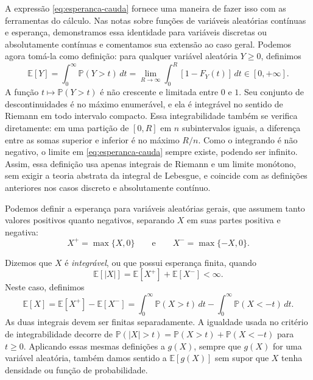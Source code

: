 \documentclass[12pt,portuguese]{article}
\theoremstyle{definition}
\theoremstyle{plainexercise}
\theoremstyle{starredexercise}
\theoremstyle{definition}
\begin{document}
A expressão \eqref{eq:esperanca-cauda} fornece uma maneira de fazer isso
com as ferramentas do cálculo. Nas notas sobre funções de variáveis
aleatórias contínuas e esperança, demonstramos essa identidade para variáveis discretas ou
absolutamente contínuas e comentamos sua extensão ao caso geral. Podemos
agora tomá-la como definição: para qualquer variável aleatória $Y\geqslant0$,
definimos
\begin{equation}\label{eq:esperanca-cauda}
\mathbb{E}[Y]
=\int_0^\infty\mathbb{P}(Y>t)\,dt
=\lim_{R\to\infty}\int_0^R[1-F_Y(t)]\,dt
\in[0,+\infty].
\end{equation}
A função $t\mapsto\mathbb{P}(Y>t)$ é não crescente e limitada entre $0$ e
$1$. Seu conjunto de descontinuidades é no máximo enumerável, e ela é
integrável no sentido de Riemann em todo intervalo compacto. Essa integrabilidade
também se verifica diretamente: em uma partição de $[0,R]$ em $n$
subintervalos iguais, a diferença entre as somas superior e inferior é no
máximo $R/n$. Como o integrando é não negativo, o limite em
\eqref{eq:esperanca-cauda} sempre existe, podendo ser infinito. Assim, essa
definição usa apenas integrais de Riemann e um limite monótono, sem exigir a
teoria abstrata da integral de Lebesgue, e coincide com as definições
anteriores nos casos discreto e absolutamente contínuo.

Podemos definir a esperança para variáveis aleatórias gerais,
que assumem tanto valores positivos quanto negativos, separando $X$ em suas partes positiva e negativa:
\[
X^+=\max\{X,0\} \qquad \text{e}\qquad X^-=\max\{-X,0\}.
\] 

Dizemos que $X$ é \emph{integrável}, ou que possui esperança finita, quando
\[ \mathbb{E}[|X|]=\mathbb{E}[X^+]+\mathbb{E}[X^-]<\infty.\] 
Neste caso, definimos
\begin{equation}\label{eq:esperanca-caudas-geral}
\mathbb{E}[X]
=\mathbb{E}[X^+]-\mathbb{E}[X^-]
=\int_0^\infty\mathbb{P}(X>t)\,dt
-\int_0^\infty\mathbb{P}(X<-t)\,dt.
\end{equation}
As duas integrais devem ser finitas separadamente. A igualdade usada no
critério de integrabilidade decorre de
$\mathbb{P}(|X|>t)=\mathbb{P}(X>t)+\mathbb{P}(X<-t)$ para $t\geqslant0$.
Aplicando essas mesmas definições a $g(X)$, sempre que $g(X)$ for uma
variável aleatória, também damos sentido a $\mathbb{E}[g(X)]$ sem supor que
$X$ tenha densidade ou função de probabilidade.
\end{document}
